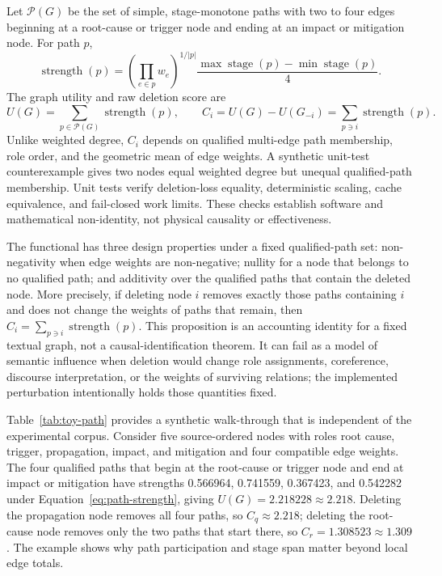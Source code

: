 \documentclass[information,article,submit,moreauthors]{Definitions/mdpi}
\begin{document}
Let $\mathcal{P}(G)$ be the set of simple, stage-monotone paths with two to four edges beginning at a root-cause or trigger node and ending at an impact or mitigation node. For path $p$,
\begin{equation}
\operatorname{strength}(p)=\left(\prod_{e\in p}w_e\right)^{1/|p|}\frac{\max\operatorname{stage}(p)-\min\operatorname{stage}(p)}{4}.
\label{eq:path-strength}
\end{equation}
The graph utility and raw deletion score are
\begin{equation}
U(G)=\sum_{p\in\mathcal{P}(G)}\operatorname{strength}(p),\qquad
C_i=U(G)-U(G_{-i})=\sum_{p\ni i}\operatorname{strength}(p).
\label{eq:deletion}
\end{equation}
Unlike weighted degree, $C_i$ depends on qualified multi-edge path membership, role order, and the geometric mean of edge weights. A synthetic unit-test counterexample gives two nodes equal weighted degree but unequal qualified-path membership. Unit tests verify deletion-loss equality, deterministic scaling, cache equivalence, and fail-closed work limits. These checks establish software and mathematical non-identity, not physical causality or effectiveness.

The functional has three design properties under a fixed qualified-path set: non-negativity when edge weights are non-negative; nullity for a node that belongs to no qualified path; and additivity over the qualified paths that contain the deleted node. More precisely, if deleting node $i$ removes exactly those paths containing $i$ and does not change the weights of paths that remain, then $C_i=\sum_{p\ni i}\operatorname{strength}(p)$. This proposition is an accounting identity for a fixed textual graph, not a causal-identification theorem. It can fail as a model of semantic influence when deletion would change role assignments, coreference, discourse interpretation, or the weights of surviving relations; the implemented perturbation intentionally holds those quantities fixed.

Table~\ref{tab:toy-path} provides a synthetic walk-through that is independent of the experimental corpus. Consider five source-ordered nodes with roles root cause, trigger, propagation, impact, and mitigation and four compatible edge weights. The four qualified paths that begin at the root-cause or trigger node and end at impact or mitigation have strengths 0.566964, 0.741559, 0.367423, and 0.542282 under Equation~\eqref{eq:path-strength}, giving $U(G)=2.218228\approx2.218$. Deleting the propagation node removes all four paths, so $C_{q}\approx2.218$; deleting the root-cause node removes only the two paths that start there, so $C_{r}=1.308523\approx1.309$. The example shows why path participation and stage span matter beyond local edge totals.
\end{document}
